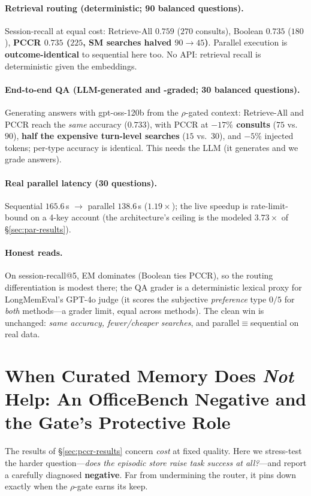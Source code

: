 \documentclass[10pt,twocolumn]{article}
\begin{document}
\paragraph{Retrieval routing (deterministic; 90 balanced questions).}
Session-recall at equal cost: Retrieve-All $0.759$ ($270$ consults), Boolean
$0.735$ ($180$), \textbf{PCCR $0.735$ ($225$, SM searches halved $90{\to}45$)}.
Parallel execution is \textbf{outcome-identical} to sequential here too. No API:
retrieval recall is deterministic given the embeddings.

\paragraph{End-to-end QA (LLM-generated and -graded; 30 balanced questions).} Generating answers with
gpt-oss-120b from the $\rho$-gated context: Retrieve-All and PCCR reach the
\emph{same} accuracy ($0.733$), with PCCR at \textbf{$-17\%$ consults}
($75$ vs.\ $90$), \textbf{half the expensive turn-level searches} ($15$ vs.\ $30$),
and $-5\%$ injected tokens; per-type accuracy is identical. This needs the LLM (it
generates and we grade answers).

\paragraph{Real parallel latency (30 questions).} Sequential $165.6$\,s
$\to$ parallel $138.6$\,s ($1.19\times$); the live speedup is rate-limit-bound on a
4-key account (the architecture's ceiling is the modeled $3.73\times$ of
\S\ref{sec:par-results}).

\paragraph{Honest reads.} On session-recall@5, EM dominates (Boolean ties PCCR), so
the routing differentiation is modest there; the QA grader is a deterministic
lexical proxy for LongMemEval's GPT-4o judge (it scores the subjective
\emph{preference} type $0/5$ for \emph{both} methods---a grader limit, equal across
methods). The clean win is unchanged: \emph{same accuracy, fewer/cheaper searches},
and parallel$\equiv$sequential on real data.

\section{When Curated Memory Does \emph{Not} Help: An OfficeBench Negative and the Gate's Protective Role}\label{sec:negative}
The results of \S\ref{sec:pccr-results} concern \emph{cost} at fixed quality. Here we
stress-test the harder question---\emph{does the episodic store raise task success at
all?}---and report a carefully diagnosed \textbf{negative}. Far from undermining the
router, it pins down exactly when the $\rho$-gate earns its keep.
\end{document}
